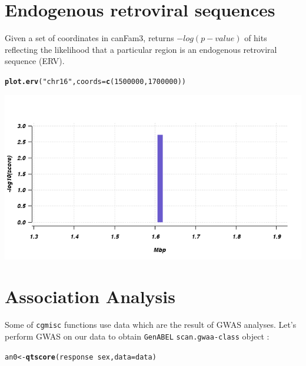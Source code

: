 \documentclass[12pt,a4paper,oneside]{article}\usepackage[]{graphicx}\usepackage[]{color}
\makeatletter
\newcommand{\hlnum}[1]{\textcolor[rgb]{0.686,0.059,0.569}{#1}}%
\newcommand{\hlstr}[1]{\textcolor[rgb]{0.192,0.494,0.8}{#1}}%
\newcommand{\hlopt}[1]{\textcolor[rgb]{0,0,0}{#1}}%
\newcommand{\hlstd}[1]{\textcolor[rgb]{0.345,0.345,0.345}{#1}}%
\newcommand{\hlkwb}[1]{\textcolor[rgb]{0.69,0.353,0.396}{#1}}%
\newcommand{\hlkwc}[1]{\textcolor[rgb]{0.333,0.667,0.333}{#1}}%
\newcommand{\hlkwd}[1]{\textcolor[rgb]{0.737,0.353,0.396}{\textbf{#1}}}%
\newenvironment{kframe}{%
 \def\at@end@of@kframe{}%
 \ifinner\ifhmode%
  \def\at@end@of@kframe{\end{minipage}}%
  \begin{minipage}{\columnwidth}%
 \fi\fi%
 \def\FrameCommand##1{\hskip\@totalleftmargin \hskip-\fboxsep
 \colorbox{shadecolor}{##1}\hskip-\fboxsep
     \hskip-\linewidth \hskip-\@totalleftmargin \hskip\columnwidth}%
 \MakeFramed {\advance\hsize-\width
   \@totalleftmargin\z@ \linewidth\hsize
   \@setminipage}}%
 {\par\unskip\endMakeFramed%
 \at@end@of@kframe}
\newenvironment{knitrout}{}{} %
\makeatother
\begin{document}
\section*{Endogenous retroviral sequences}
Given a set of coordinates in canFam3, returns $-log(p-value)$ of hits reflecting the likelihood that a particular region is an endogenous retroviral sequence (ERV). 
\begin{knitrout}\footnotesize
{}\color{fgcolor}\begin{kframe}
\begin{alltt}
\hlkwd{plot.erv}\hlstd{(}\hlstr{"chr16"}\hlstd{,} \hlkwc{coords} \hlstd{=} \hlkwd{c}\hlstd{(}\hlnum{1500000}\hlstd{,} \hlnum{1700000}\hlstd{))}
\end{alltt}
\end{kframe}

{\centering \includegraphics[width=1.0\textwidth]{images/plot_ervs} 

}



\end{knitrout}

\section*{Association Analysis}
\noindent Some of \texttt{cgmisc} functions use data which are the result of GWAS analyses. Let's perform GWAS on our data to obtain \texttt{GenABEL} \texttt{scan.gwaa-class} object : 

\begin{knitrout}\footnotesize
{}\color{fgcolor}\begin{kframe}
\begin{alltt}
\hlstd{an0} \hlkwb{<-} \hlkwd{qtscore}\hlstd{(response} \hlopt{~} \hlstd{sex,} \hlkwc{data} \hlstd{= data)}
\end{alltt}


{\ttfamily\noindent\color{warningcolor}{\#\# Warning: 1 observations deleted due to missingness}}\end{kframe}
\end{knitrout}
\end{document}

